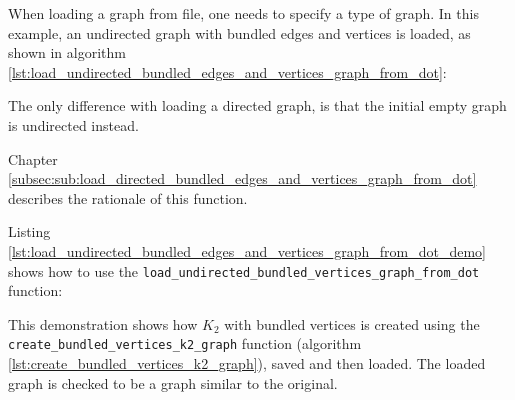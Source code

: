 When loading a graph from file, one needs to specify a type of graph.
In this example, an undirected graph with bundled edges and vertices is
loaded, as shown in algorithm 
\ref{lst:load_undirected_bundled_edges_and_vertices_graph_from_dot}:



The only difference with loading a directed graph, is that the initial empty
graph is undirected instead.

Chapter \ref{subsec:sub:load_directed_bundled_edges_and_vertices_graph_from_dot}
describes the rationale of this function.

Listing \ref{lst:load_undirected_bundled_edges_and_vertices_graph_from_dot_demo}
shows how to use the \verb;load_undirected_bundled_vertices_graph_from_dot;
function:



This demonstration shows how $K_{2}$
with bundled vertices is created using the 
\verb;create_bundled_vertices_k2_graph; function 
(algorithm \ref{lst:create_bundled_vertices_k2_graph}), 
saved and then loaded. 
The loaded graph is checked to be a graph similar to the original.

